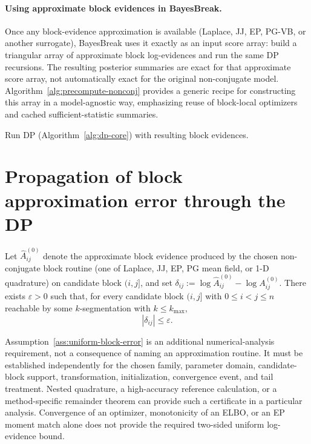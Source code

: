 \paragraph{Using approximate block evidences in BayesBreak.}
Once any block-evidence approximation is available (Laplace, JJ, EP, PG-VB, or another surrogate), BayesBreak uses it exactly as an input score array: build a triangular array of approximate block log-evidences and run the same DP recursions. The resulting posterior summaries are exact for that approximate score array, not automatically exact for the original non-conjugate model.
Algorithm~\ref{alg:precompute-nonconj} provides a generic recipe for constructing this array in a model-agnostic way, emphasizing reuse of block-local optimizers and cached sufficient-statistic summaries.

\begin{algorithm}[H]
\caption{Precompute block evidences for non-conjugate GLMs}
\label{alg:precompute-nonconj}
\For{$i=0$ \KwTo $n-1$}{
  Initialize running summaries (as needed)\;
  \For{$j=i+1$ \KwTo $n$}{
    Update block summaries for $(i,j]$\;
    Call chosen block routine to compute $\widehat{A}^{(0)}_{ij}$ (and optional moments)\;
  }
}
Run DP (Algorithm~\ref{alg:dp-core}) with resulting block evidences.
\end{algorithm}

\section{Propagation of block approximation error through the DP}

\begin{assumption}
\label{ass:uniform-block-error}
Let $\widehat A^{(0)}_{ij}$ denote the approximate block evidence produced by the chosen
non-conjugate block routine (one of Laplace, JJ, EP, PG mean field, or 1-D quadrature) on
candidate block $(i,j]$, and set $\delta_{ij}:=\log\widehat A^{(0)}_{ij}-\log A^{(0)}_{ij}$.
There exists $\varepsilon>0$ such that, for every candidate block $(i,j]$ with
$0\le i<j\le n$ reachable by some $k$-segmentation with $k\le k_{\max}$,
\[
|\delta_{ij}|\le \varepsilon.
\]
\end{assumption}

Assumption~\ref{ass:uniform-block-error} is an additional numerical-analysis requirement, not a
consequence of naming an approximation routine. It must be established independently for the
chosen family, parameter domain, candidate-block support, transformation, initialization,
convergence event, and tail treatment. Nested quadrature, a high-accuracy reference calculation,
or a method-specific remainder theorem can provide such a certificate in a particular analysis.
Convergence of an optimizer, monotonicity of an ELBO, or an EP moment match alone does not provide
the required two-sided uniform log-evidence bound.

